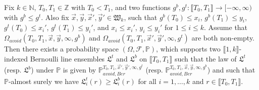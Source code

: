 \begin{lemma}
	Fix $k \in \mathbb{N}$, $T_0, T_1 \in \mathbb{Z}$ with $T_0 < T_1$, and two functions $g^b, g^t: \llbracket T_0, T_1 \rrbracket  \rightarrow [-\infty, \infty)$ with $g^b\leq g^t$. Also fix $\vec{x}, \vec{y}, \vec{x}', \vec{y}' \in \mathfrak{W}_k$, such that $g^b(T_0)\leq x_i$, $g^b(T_1)\leq y_i$, $g^t(T_0)\leq x_i'$, $g^t(T_1)\leq y_i'$, and $x_i\leq x_i'$, $y_i\leq y_i'$ for $1\leq i\leq k$. Assume that $\Omega_{avoid}(T_0, T_1, \vec{x}, \vec{y}, \infty,g^b)$ and $\Omega_{avoid}(T_0, T_1, \vec{x}', \vec{y}', \infty,g^t)$ are both non-empty. Then there exists a probability space $(\Omega, \mathcal{F}, \mathbb{P})$, which supports two $\llbracket 1, k \rrbracket$-indexed Bernoulli line ensembles $\mathfrak{L}^t$ and $\mathfrak{L}^b$ on $\llbracket T_0, T_1 \rrbracket$ such that the law of $\mathfrak{L}^{t}$ {\big (}resp. $\mathfrak{L}^b${\big )} under $\mathbb{P}$ is given by $\mathbb{P}_{avoid, Ber}^{T_0, T_1, \vec{x}', \vec{y}', \infty, g^t}$ {\big (}resp. $\mathbb{P}_{avoid, Ber}^{T_0, T_1, \vec{x}, \vec{y}, \infty, g^b}${\big )} and such that $\mathbb{P}$-almost surely we have $\mathfrak{L}_i^t(r) \geq \mathfrak{L}^b_i(r)$ for all $i = 1,\dots, k$ and $r \in \llbracket T_0, T_1 \rrbracket$.
\end{lemma}

